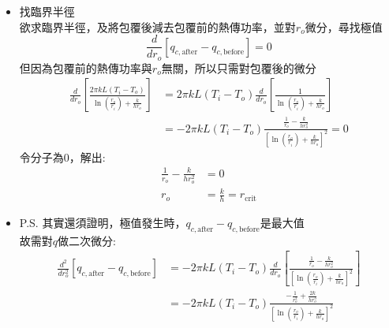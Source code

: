 \documentclass[../main.tex]{subfiles}
\begin{document}
\begin{itemize}
\begin{itemize}
\begin{itemize}
        等效熱阻:
        \begin{equation}
          R_{\text{total}} = R_k + R_c = \frac{\ln\left(\frac{r_o}{r_i}\right)}{2\pi kL} + \frac{1}{h(2\pi r_o L)}
        \end{equation}
        熱傳功率:
        \begin{equation}
          q_c = \frac{T_i - T_o}{R_{\text{total}}} = \frac{2\pi kL (T_i - T_o)}{\ln\left(\frac{r_o}{r_i}\right) + \frac{k}{h r_o}}
        \end{equation}
      \item 找臨界半徑\\
        欲求臨界半徑，及將包覆後減去包覆前的熱傳功率，並對$r_o$微分，尋找極值
        \begin{equation}
          \frac{d}{dr_o}\left[q_{c,\text{after}} - q_{c,\text{before}}\right] = 0
        \end{equation}
        但因為包覆前的熱傳功率與$r_o$無關，所以只需對包覆後的微分
        \begin{align}
          \frac{d}{dr_o}\left[\frac{2\pi kL (T_i - T_o)}{\ln\left(\frac{r_o}{r_i}\right) + \frac{k}{h r_o}}\right] &=
          2\pi kL (T_i - T_o) \frac{d}{dr_o}\left[\frac{1}{\ln\left(\frac{r_o}{r_i}\right) + \frac{k}{h r_o}}\right] \nonumber\\
          &= -2\pi kL (T_i - T_o) \frac{\frac{1}{r_o} - \frac{k}{h r_o^2}}{\left[\ln\left(\frac{r_o}{r_i}\right) + \frac{k}{h r_o}\right]^2}
          = 0
        \end{align}
        令分子為0，解出:
        \begin{align}
          \frac{1}{r_o} - \frac{k}{h r_o^2} &= 0 \nonumber\\
          r_o &= \boxed{\frac{k}{h} = r_{\text{crit}}}
        \end{align}
        \item P.S. 其實還須證明，極值發生時，$q_{c,\text{after}} - q_{c,\text{before}}$是最大值\\
        故需對$q$做二次微分:
        \begin{align}
          \frac{d^2}{dr_o^2}\left[q_{c,\text{after}} - q_{c,\text{before}}\right]&=
          -2\pi kL (T_i - T_o) \frac{d}{dr_o}\left[\frac{\frac{1}{r_o} 
          - \frac{k}{h r_o^2}}{\left[\ln\left(\frac{r_o}{r_i}\right) + \frac{k}{h r_o}\right]^2}\right] \nonumber\\
          &=-2\pi kL (T_i - T_o) \frac{-\frac{1}{r_o^2} + \frac{2k}{h r_o^3}}{\left[\ln\left(\frac{r_o}{r_i}\right) + \frac{k}{h r_o}\right]^2} \nonumber\\

\end{align}
\end{itemize}
\end{itemize}
\end{itemize}
\end{document}
